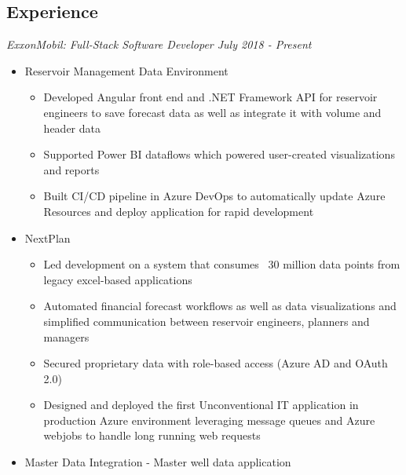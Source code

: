 \documentclass[line,overlapped,9pt]{res}
\begin{document}
\setlength\itemsep{.25em}
\address{Email: kllinzy1@gmail.com}
\address{Mobile: (918)440-3563}

\begin{resume}

  \section{Experience} {\sl ExxonMobil: Full-Stack Software Developer \hfill July 2018 - \sl Present}
                 \begin{itemize}[leftmargin=*]   %
                 \item[] Reservoir Management Data Environment 
                   \begin{itemize}
                  \setlength\itemsep{.1em}
                   \item Developed Angular front end and .NET Framework API for reservoir engineers to save forecast data as well as integrate it with volume and header data
                   \item Supported Power BI dataflows which powered user-created visualizations and reports
                   \item Built CI/CD pipeline in Azure DevOps to automatically update Azure Resources and deploy application for rapid development 
                  \end{itemize}
                  \setlength\itemsep{.1em}
                 \item[] NextPlan
                   \begin{itemize}
                  \setlength\itemsep{.1em}
                   \item Led development on a system that consumes ~30 million data points from legacy excel-based applications
                   \item Automated financial forecast workflows as well as data visualizations and simplified communication between reservoir engineers, planners and managers
                   \item Secured proprietary data with role-based access (Azure AD and OAuth 2.0)
                   \item Designed and deployed the first Unconventional IT application in production Azure environment leveraging message queues and Azure webjobs to handle long running web requests 
                  \end{itemize}
                 \item[] Master Data Integration - Master well data application

\end{itemize}
\end{resume}
\end{document}
